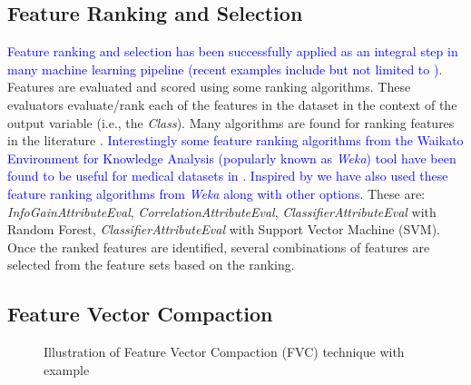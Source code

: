 \subsection{Feature Ranking and Selection} \label{s:feature_ranking_selection}
\textcolor{blue}{Feature ranking and selection has been successfully applied as an integral step in many machine learning pipeline (recent examples include but not limited to \cite{Zahangir2019, Saifur20181st, Saifur20182nd, Saifur2019})}. Features are evaluated and scored using some ranking algorithms. These evaluators evaluate/rank each of the features in the dataset in the context of the output variable (i.e., the \textit{Class}). Many algorithms are found for ranking features in the literature \cite{Dash:1997, Roberto:2003, Jasmina:2011, Kamkar2015, Baalachandran2015, Zhang2017, Zahangir2019}. \textcolor{blue}{Interestingly some feature ranking algorithms from the Waikato Environment for Knowledge Analysis (popularly known as \textit{Weka}) tool have been found to be useful for medical datasets in \cite{Zahangir2019}. Inspired by \cite{Zahangir2019} we have also used these feature ranking algorithms from \textit{Weka} along with other options.} These are: \textit{InfoGainAttributeEval}, \textit{CorrelationAttributeEval}, \textit{ClassifierAttributeEval} with Random Forest, \textit{ClassifierAttributeEval} with Support Vector Machine (SVM). Once the ranked features are identified, several combinations of features are selected from the feature sets based on the ranking.

\subsection{Feature Vector Compaction}

\begin{figure}[h] 
	\centering 
	\caption{Illustration of Feature Vector Compaction (FVC) technique with example}
	\label{F:fvcwithexample}
\end{figure}

